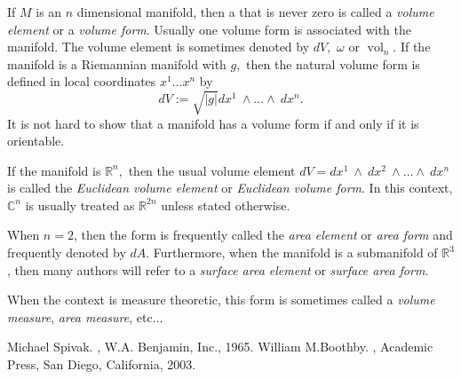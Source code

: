 \documentclass[12pt]{article}
\theoremstyle{theorem}
\theoremstyle{definition}
\theoremstyle{remark}
\begin{document}
If $M$ is an $n$ dimensional manifold, then a  that is never zero is called a {\em volume element}
or a {\em volume form}.  Usually one volume form is associated with the manifold.  The volume element is sometimes denoted
by $dV,$ $\omega$ or $\operatorname{vol}_n.$
If the manifold is a Riemannian manifold with  $g,$ then the natural volume form is defined in local coordinates $x^1 \ldots x^n$ by
\begin{equation*}
dV := \sqrt{\lvert g \rvert} dx^1 ~ \wedge \ldots \wedge ~dx^n .
\end{equation*}
It is not hard to show that a manifold has a volume form if and only if it is orientable.

If the manifold is ${\mathbb{R}}^n,$ then
the usual volume element $dV = dx^1~ \wedge ~ dx^2 ~ \wedge \ldots \wedge ~dx^n$ is called the {\em Euclidean volume element}
or {\em Euclidean volume form}.
In this context, ${\mathbb{C}}^n$ is usually treated as ${\mathbb{R}}^{2n}$ unless stated otherwise.

When $n=2$, then the form is frequently called the {\em area element} or {\em area form} and frequently denoted
by $dA$.  Furthermore, when the manifold is a submanifold of ${\mathbb{R}}^3$, then many authors will refer to
a {\em surface area element} or {\em surface area form}.

When the context is measure theoretic, this form is sometimes called a {\em volume measure}, {\em area measure},
etc...

\begin{thebibliography}{9}
Michael Spivak.
{\em {}},
W.A. Benjamin, Inc., 1965.
William M.\@ Boothby.
{\em {}},
Academic Press, San Diego, California, 2003.
\end{thebibliography}
\end{document}
